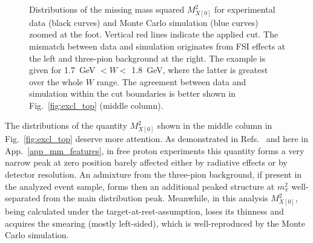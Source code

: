 \begin{figure}[!ht]
\begin{center}
\end{center}
\caption{\small Distributions of the missing mass squared $M^{2}_{X[0]}$ for experimental data (black curves) and Monte Carlo simulation (blue curves) zoomed at the foot. Vertical red lines indicate the applied cut. The mismatch between data and simulation originates from FSI effects at the left and three-pion background at the right. The example is given for 1.7~GeV $< W <$ 1.8~GeV, where the latter is greatest over the whole $W$ range. The agreement between data and simulation within the cut boundaries is better shown in Fig.~\ref{fig:excl_top} (middle column).}
\label{fig:mm_0_zoomed}
\end{figure}


The distributions of the quantity $M^{2}_{X[0]}$ shown in the middle column in Fig.~\ref{fig:excl_top} deserve more attention. As demonstrated in Refs.~\cite{Fed_an_note:2017,Fed_paper_2018} and here in App.~\ref{app_mm_features}, in free proton experiments this quantity forms a very narrow peak at zero position barely affected either by radiative effects or by detector resolution. An admixture from the three-pion background, if present in the analyzed event sample, forms then an additional peaked structure at $m_{\pi}^{2}$ well-separated from the main distribution peak. Meanwhile, in this analysis $M^{2}_{X[0]}$, being calculated under the target-at-rest-assumption, loses its thinness and acquires the smearing (mostly left-sided), which is well-reproduced by the Monte Carlo simulation.

